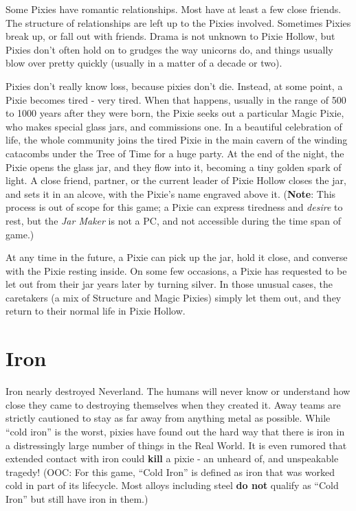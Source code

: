 \documentclass[blue]{PP}
\begin{document}
Some Pixies have romantic relationships. Most have at least a few close friends. The structure of relationships are left up to the Pixies involved. Sometimes Pixies break up, or fall out with friends. Drama is not unknown to Pixie Hollow, but Pixies don’t often hold on to grudges the way unicorns do, and things usually blow over pretty quickly (usually in a matter of a decade or two).

Pixies don’t really know loss, because pixies don’t die. Instead, at some point, a Pixie becomes tired - very tired. When that happens, usually in the range of 500 to 1000 years after they were born, the Pixie seeks out a particular Magic Pixie, who makes special glass jars, and commissions one. In a beautiful celebration of life, the whole community joins the tired Pixie in the main cavern of the winding catacombs under the Tree of Time for a huge party. At the end of the night, the Pixie opens the glass jar, and they flow into it, becoming a tiny golden spark of light.  A close friend, partner, or the current leader of Pixie Hollow closes the jar, and sets it in an alcove, with the Pixie’s name engraved above it. (\textbf{Note}: This process is out of scope for this game; a Pixie can express tiredness and \textit{desire} to rest, but the \textit{Jar Maker} is not a PC, and not accessible during the time span of game.)

At any time in the future, a Pixie can pick up the jar, hold it close, and converse with the Pixie resting inside. On some few occasions, a Pixie has requested to be let out from their jar years later by turning silver. In those unusual cases, the caretakers (a mix of Structure and Magic Pixies) simply let them out, and they return to their normal life in Pixie Hollow.

\section*{Iron}
Iron nearly destroyed Neverland. The humans will never know or understand how close they came to destroying themselves when they created it. Away teams are strictly cautioned to stay as far away from anything metal as possible. While “cold iron” is the worst, pixies have found out the hard way that there is iron in a distressingly large number of things in the Real World. It is even rumored that extended contact with iron could \textbf{kill} a pixie - an unheard of, and unspeakable tragedy! (OOC: For this game, “Cold Iron” is defined as iron that was worked cold in part of its lifecycle. Most alloys including steel \textbf{do not} qualify as “Cold Iron” but still have iron in them.)
\end{document}

